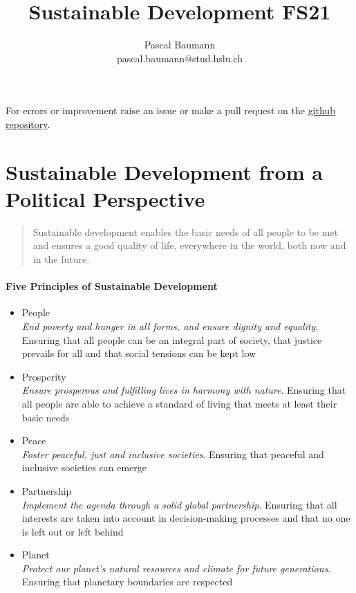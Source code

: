 \documentclass[11pt]{article}
\theoremstyle{definition}
\begin{document}
	
\title{Sustainable Development FS21}
\author{Pascal Baumann\\pascal.baumann@stud.hslu.ch}
\maketitle

For errors or improvement raise an issue or make a pull request on the \href{https://github.com/KilnOfTheSecondFlame/mse_summaries}{github repository}.

\tableofcontents
\newpage

\section{Sustainable Development from a Political Perspective}
\begin{quote}
	Sustainable development enables the basic needs of all people to be met and ensures a good quality of life, everywhere in the world, both now and in the future.
\end{quote}

\paragraph{Five Principles of Sustainable Development}
\begin{itemize}
	\item People\\\textit{End poverty and hunger in all forms, and ensure dignity and equality}. Ensuring that all people can be an integral part of society, that justice prevails for all and that social tensions can be kept low
	\item Prosperity\\\textit{Ensure prosperous and fulfilling lives in harmony with nature}. Ensuring that all people are able to achieve a standard of living that meets at least their basic needs
	\item Peace\\\textit{Foster peaceful, just and inclusive societies}. Ensuring that peaceful and inclusive societies can emerge
	\item Partnership\\\textit{Implement the agenda through a solid global partnership}. Ensuring that all interests are taken into account in decision-making processes and that no one is left out or left behind
	\item Planet\\\textit{Protect our planet's natural resources and climate for future generations}. Ensuring that planetary boundaries are respected
\end{itemize}
\end{document}
